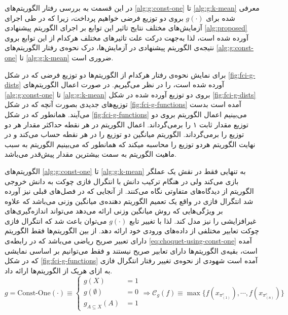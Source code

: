 در این قسمت به بررسی رفتار الگوریتم‌های \ref{alg:g:const-one} تا \ref{alg:g:k-mean} معرفی شده برای $g(\cdot)$ بروی دو توزیع فرضی خواهیم پرداخت، زیرا که در طی اجرای آزمایش‌های مختلف نتایج تاثیر این توابع بر اجرای الگوریتم پیشنهادی \ref{alg:proposed} آورده شده است، لذا به‌جهت درکت علت تاثیرهای مختلف هرکدام از این توابع بروی نتیجه‌ی الگوریتم پیشنهادی در آزمایش‌ها، درک نحوه‌ی رفتار الگوریتم‌های \ref{alg:g:const-one} تا \ref{alg:g:k-mean} ضروری است.


برای نمایش نحوه‌ی رفتار هرکدام از الگوریتم‌ها دو توزیع فرضی که در شکل \ref{fig:fci-g-dists} آورده شده است، را در نظر می‌گیریم. در صورت اعمال الگوریتم‌های \ref{alg:g:const-one} تا \ref{alg:g:k-mean} بروی دو توزیع آورده شده در شکل \ref{fig:fci-g-dists} توزیع‌های جدیدی بصورت آنچه که در شکل \ref{fig:fci-g-functions} آمده است بدست می‌آیند. همانطور که در شکل \ref{fig:fci-g-functions} می‌بینیم اعمال الگوریتم  بروی دو توزیع مقدار ثابت ۱ را برمی‌گرداند. اعمال الگوریتم  در هر نقطه حداکثر مقدار هر دو توزیع را برمی‌گرداند. الگوریتم  میانگین دو توزیع را در هر نقطه حساب می‌کند و در نهایت الگوریتم  هردو توزیع را محاسبه میکند که همانطور که می‌بینیم الگوریتم  به سبب ماهیت الگوریتم به سمت بیشترین مقدار پیش‌قدر می‌باشد.

الگوریتم‌های \ref{alg:g:const-one} تا \ref{alg:g:k-mean} به تنهایی فقط در نقش یک عملگر بازی می‌کند ولی در هنگام ترکیب دانش با انتگرال فازی چوکت به دانش خروجی الگوریتم از دیدگاه‌های متفاوتی نگاه می‌کنند. از آنجایی که در فصل‌های قبلی نیز آورده شد انتگرال فازی در واقع یک تعمیم الگوریتم دهنده‌ی میانگین وزنی می‌باشد که علاوه بر ویژگی‌هایی که روش میانگین وزنی ارائه می‌دهد می‌تواند اندازه‌گیری‌های غیرافزایشی را نیز مدل کند. لذا با تغییر تابع $g(\cdot)$ می‌توان باعث شد که انتگرال فازی چوکت تعابیر مختلفی از داده‌های ورودی خود ارائه دهد. از بین الگوریتم‌ها فقط الگوریتم  دارای تعبیر صریح ریاضی می‌باشد که در رابطه‌ی
\ref{eq:choquet-using-const-one}
آمده است، بقیه‌ی الگوریتم‌ها دارای تعابیر صریح نیستند و فقط می‌توانیم بر اساسی نمایشی که در شکل \ref{fig:fci-g-functions} آمده است شهودی از نحوه‌ی تغییر رفتار انتگرال فازی به ازای هریک از الگوریتم‌ها ارائه داد.
\begin{equation}
g = \text{Const-One}(\cdot) \equiv \begin{cases}
g(X) &= 1\\
g(\emptyset) &= 0\\
g_{A \subseteq X}(A) &= 1
\end{cases} \Rightarrow \mathcal{C}_g(f) \equiv \max\{f(x_{\pi^c_{(1)}}), \cdots, f(x_{\pi^c_{(n)}})\}\label{eq:choquet-using-const-one}
\end{equation}

